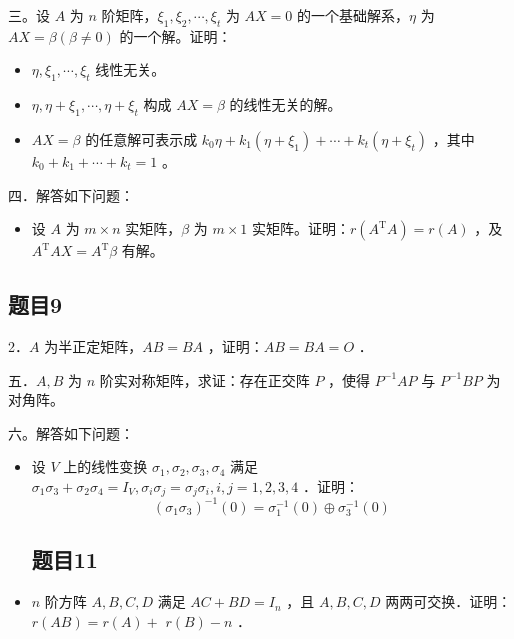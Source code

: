 \documentclass{article}
\begin{document}
三。设 \(A\) 为 \(n\) 阶矩阵，\(\xi_{1}, \xi_{2}, \cdots, \xi_{t}\) 为 \(A X=0\) 的一个基础解系，\(\eta\) 为 \(A X=\beta(\beta \neq 0)\) 的一个解。证明：

\begin{itemize}

  \item[1．] \(\eta, \xi_{1}, \cdots, \xi_{t}\) 线性无关。

  \item[2．] \(\eta, \eta+\xi_{1}, \cdots, \eta+\xi_{t}\) 构成 \(A X=\beta\) 的线性无关的解。

  \item[3．] \(A X=\beta\) 的任意解可表示成 \(k_{0} \eta+k_{1}\left(\eta+\xi_{1}\right)+\cdots+k_{t}\left(\eta+\xi_{t}\right)\) ，其中 \(k_{0}+k_{1}+\cdots+k_{t}=1\) 。
\end{itemize}

四．解答如下问题：

\begin{itemize}

\subsection{题目8}
  \item[1．] 设 \(A\) 为 \(m \times n\) 实矩阵，\(\beta\) 为 \(m \times 1\) 实矩阵。证明：\(r\left(A^{\mathrm{T}} A\right)=r(A)\) ，及 \(A^{\mathrm{T}} A X=A^{\mathrm{T}} \beta\) 有解。
\end{itemize}

\subsection{题目9}
2．\(A\) 为半正定矩阵，\(A B=B A\) ，证明：\(A B=B A=O\) ．

五．\(A, B\) 为 \(n\) 阶实对称矩阵，求证：存在正交阵 \(P\) ，使得 \(P^{-1} A P\) 与 \(P^{-1} B P\) 为对角阵。

六。解答如下问题：

\begin{itemize}

\subsection{题目10}
  \item[1．] 设 \(V\) 上的线性变换 \(\sigma_{1}, \sigma_{2}, \sigma_{3}, \sigma_{4}\) 满足 \(\sigma_{1} \sigma_{3}+\sigma_{2} \sigma_{4}=I_{V}, \sigma_{i} \sigma_{j}=\sigma_{j} \sigma_{i}, i, j=1,2,3,4\) ．证明：
\[
\left(\sigma_{1} \sigma_{3}\right)^{-1}(0)=\sigma_{1}^{-1}(0) \oplus \sigma_{3}^{-1}(0)
\]

\subsection{题目11}
  \item[2．] \(n\) 阶方阵 \(A, B, C, D\) 满足 \(A C+B D=I_{n}\) ，且 \(A, B, C, D\) 两两可交换．证明：\(r(A B)=r(A)+\) \(r(B)-n\) ．
\end{itemize}
\end{document}
